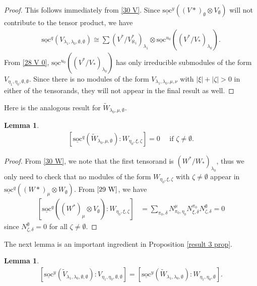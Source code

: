 \documentclass[openany, a4paper]{amsbook}
\newtheorem{lem}[thm]{Lemma}
\theoremstyle{definition}
\numberwithin{equation}{chapter}
\newcommand{\socl}[2]{\underline{\mathrm{soc}}^{#1}({#2})}
\begin{document}
\begin{proof}
    This follows immediately from \eqref{30 V}. Since $\socl{y}{ (V*)_\emptyset \otimes V_\emptyset}$ will not contribute to the tensor product, we have 
    \begin{align}
        \socl{q}{V_{\lambda_1, \lambda_0, \emptyset, \emptyset}} \cong \sum  (V^\ast/V^{\ast}_{\aleph_1})_{\lambda_1} \otimes \socl{u_0}{(V^\ast/V_\ast)_{\lambda_0}}.
    \end{align}
    From \eqref{28 V 0}, $\socl{u_0}{(V^\ast/V_\ast)_{\lambda_0}}$ has only irreducible submodules of the form $V_{\eta_1, \eta_0, \emptyset, \emptyset }$. Since there is no modules of the form $V_{\lambda_1, \lambda_0, \mu, \nu}$ with $\left\lvert \xi \right\rvert + \left\lvert \zeta \right\rvert > 0$ in either of the tensorands, they will not appear in the final result as well.
\end{proof}

Here is the analogous result for $\tilde{W}_{\lambda_0, \mu, \emptyset}$.
\begin{lem}\label{socle 4}
    \begin{align*}
        \left[ \socl{q}{\tilde{W}_{\lambda_0, \mu, \emptyset}} \colon W_{\eta_0, \xi, \zeta } \right] = 0 \quad \text{ if } \zeta \neq \emptyset.
    \end{align*}
\end{lem}

\begin{proof}
    From \eqref{30 W}, we note that the first tensorand is $(W^\ast/W_\ast)_{\lambda_0}$, thus we only need to check that no modules of the form $W_{\eta_0, \xi, \zeta}$ with $\zeta \neq \emptyset$ appear in $\socl{q}{ (W*)_\mu \otimes W_\emptyset}$. From $\eqref{29 W}$, we have
    \begin{align*}
        \left[ \socl{q}{(W^\ast)_\mu \otimes V_\emptyset } \colon W_{\eta_0, \xi, \zeta }  \right] &= \sum_{\pi_0, \delta} N^{\mu}_{\pi_0, \eta_0} N^{\pi_0}_{\xi, \delta} N^{\emptyset}_{\zeta, \delta} = 0
    \end{align*}
    since $N^{\emptyset}_{\zeta, \delta} = 0$ for all $\zeta \neq \emptyset$.
\end{proof}

The next lemma is an important ingredient in Proposition \ref*{result 3 prop}.

\begin{lem}\label{socle 3}
    \begin{align*}
        \left[ \socl{y}{\tilde{V}_{\lambda_1, \lambda_0, \emptyset, \emptyset}} \colon V_{\eta_1, \eta_0, \emptyset, \emptyset }  \right] = 
        \left[ \socl{y}{\tilde{W}_{\lambda_1, \lambda_0, \emptyset}} \colon W_{\eta_1, \eta_0, \emptyset }  \right].
    \end{align*}
\end{lem}
\end{document}
